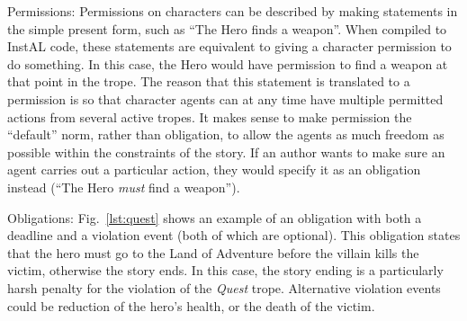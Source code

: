 \begin{compactdesc}
\item[Permissions:]
Permissions on characters can be described by making statements in the simple present form, such as ``The Hero finds a weapon''. When compiled to InstAL code, these statements are equivalent to giving a character permission to do something. In this case, the Hero would have permission to find a weapon at that point in the trope.
The reason that this statement is translated to a permission is so that character agents can at any time have multiple permitted actions from several active tropes. It makes sense to make permission the ``default'' norm, rather than obligation, to allow the agents as much freedom as possible within the constraints of the story. If an author wants to make sure an agent carries out a particular action, they would specify it as an obligation instead (``The Hero \emph{must} find a weapon'').

\item[Obligations:]
Fig.~\ref{lst:quest} shows an example of an obligation with both a deadline and a violation event (both of which are optional). This obligation states that the hero must go to the Land of Adventure before the villain kills the victim, otherwise the story ends. In this case, the story ending is a particularly harsh penalty for the violation of the \emph{Quest} trope. Alternative violation events could be reduction of the hero's health, or the death of the victim.


\end{compactdesc}
